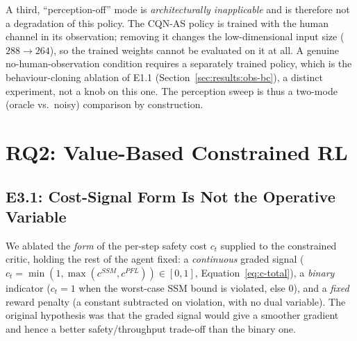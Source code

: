 \documentclass[11pt,a4paper]{report}
\newcommand{\ssm}{SSM}
\newcommand{\pfl}{PFL}
\newcommand{\cqnas}{CQN-AS}
\begin{document}
A third, ``perception-off'' mode is \emph{architecturally
inapplicable} and is therefore not a degradation of this policy. The
\cqnas{} policy is trained with the human channel in its observation;
removing it changes the low-dimensional input size ($288 \to 264$), so
the trained weights cannot be evaluated on it at all. A genuine
no-human-observation condition requires a separately trained policy,
which is the behaviour-cloning ablation of E1.1
(Section~\ref{sec:results:obs-bc}), a distinct experiment, not a knob
on this one. The perception sweep is thus a two-mode (oracle vs.\
noisy) comparison by construction.

\section{RQ2: Value-Based Constrained RL}
\label{sec:results:rq2}

\subsection{E3.1: Cost-Signal Form Is Not the Operative Variable}
\label{sec:results:cost-signal}

We ablated the \emph{form} of the per-step safety cost $c_t$ supplied
to the constrained critic, holding the rest of the agent fixed: a
\emph{continuous} graded signal
($c_t = \min(1,\max(c^{\ssm},c^{\pfl})) \in [0,1]$,
Equation~\ref{eq:c-total}), a \emph{binary} indicator ($c_t = 1$ when
the worst-case \ssm{} bound is violated, else $0$), and a \emph{fixed}
reward penalty (a constant subtracted on violation, with no dual
variable). The original hypothesis was that the graded signal would
give a smoother gradient and hence a better safety/throughput trade-off
than the binary one.
\end{document}
